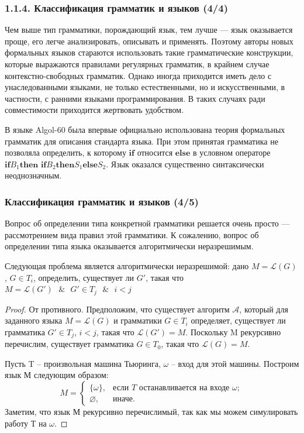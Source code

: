 \begin{frame}
\frametitle{1.1.4. Классификация грамматик и языков (4/4)}

\begin{digress}
Чем выше тип грамматики, 
порождающий язык, тем лучше ---
язык оказывается проще,
его легче анализировать,
описывать и применять.
Поэтому авторы новых
формальных языков стараются
использовать такие грамматические конструкции,
которые выражаются правилами
регулярных грамматик,
в крайнем случае контекстно-свободных грамматик.
Однако иногда приходится иметь дело
с унаследованными языками, 
не только естественными,
но и искусственными, в частности,
с ранними языками программирования.
В таких случаях ради совместимости
приходится жертвовать удобством.  
\end{digress}

\begin{example}
В языке Algol-60 была 
впервые официально использована теория 
формальных грамматик для описания стандарта языка.
При этом принятая  грамматика не позволяла 
определить, к которому $\textbf{if}$ 
относится $\textbf{else}$ 
в условном операторе $\textbf{if}
B_1 \textbf{then if} B_2 \textbf{then}
S_1 \textbf{else} S_2$. 
Язык оказался существенно 
синтаксически неоднозначным.
\end{example}

\end{frame}

\begin{frame}
    \frametitle{Классификация грамматик и языков (4/5)}
    Вопрос об определении типа конкретной грамматики решается очень просто — рассмотрением вида правил этой грамматики. К сожалению, вопрос об определении типа языка оказывается алгоритмически неразрешимым.
    \begin{theorem}
        Следующая проблема является алгоритмически неразрешимой: дано $M = \mathcal{L}(G)$, $G \in T_i$, определить, существует ли $G'$, такая что $M = \mathcal{L}(G') \text{ $\&$ } G' \in T_j \text{ $\&$ } i < j$
    \end{theorem}
    \begin{proof} От противного. Предположим, что существует алгоритм $\mathcal{A}$, который для заданного языка $M = \mathcal{L}(G)$ и грамматики $G \in T_i$ определяет, существует ли грамматика $G' \in T_j$, $i < j$, такая что $\mathcal{L}(G') = M$. Поскольку M рекурсивно перечислим, существует грамматика $G \in T_0$, такая что $\mathcal{L}(G) = M$.

        Пусть T – произвольная машина Тьюринга, $\omega$ – вход для этой машины.
        Построим язык М следующим образом:
        \[
            M =
            \begin{cases}
                \{\omega\},  & \text{если } T \text{ останавливается на входе } \omega; \\
                \varnothing, & \text{иначе.}
            \end{cases}
        \]
        Заметим, что язык М рекурсивно перечислимый, так как мы можем симулировать работу Т на $\omega$.
    \end{proof}
\end{frame}

